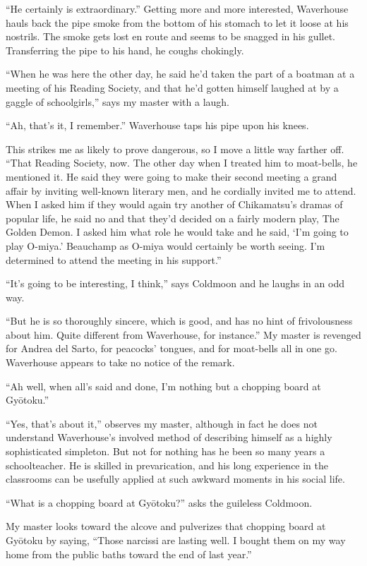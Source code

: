 \documentclass{book}
\begin{document}
``He certainly is extraordinary.'' Getting more and more interested,
Waverhouse hauls back the pipe smoke from the bottom of his stomach to
let it loose at his nostrils. The smoke gets lost en route and seems to
be snagged in his gullet. Transferring the pipe to his hand, he coughs
chokingly.

``When he was here the other day, he said he'd taken the part of a
boatman at a meeting of his Reading Society, and that he'd gotten
himself laughed at by a gaggle of schoolgirls,'' says my master with a
laugh.

``Ah, that's it, I remember.'' Waverhouse taps his pipe upon his knees.

This strikes me as likely to prove dangerous, so I move a little way
farther off. ``That Reading Society, now. The other day when I treated
him to moat-bells, he mentioned it. He said they were going to make
their second meeting a grand affair by inviting well-known literary men,
and he cordially invited me to attend. When I asked him if they would
again try another of Chikamatsu's dramas of popular life, he said no and
that they'd decided on a fairly modern play, The Golden Demon. I asked
him what role he would take and he said, `I'm going to play O-miya.'
Beauchamp as O-miya would certainly be worth seeing. I'm determined to
attend the meeting in his support.''

``It's going to be interesting, I think,'' says Coldmoon and he laughs
in an odd way.

``But he is so thoroughly sincere, which is good, and has no hint of
frivolousness about him. Quite different from Waverhouse, for
instance.'' My master is revenged for Andrea del Sarto, for peacocks'
tongues, and for moat-bells all in one go. Waverhouse appears to take no
notice of the remark.

``Ah well, when all's said and done, I'm nothing but a chopping board at
Gyōtoku.''

``Yes, that's about it,'' observes my master, although in fact he does
not understand Waverhouse's involved method of describing himself as a
highly sophisticated simpleton. But not for nothing has he been so many
years a schoolteacher. He is skilled in prevarication, and his long
experience in the classrooms can be usefully applied at such awkward
moments in his social life.

``What is a chopping board at Gyōtoku?'' asks the guileless Coldmoon.

My master looks toward the alcove and pulverizes that chopping board at
Gyōtoku by saying, ``Those narcissi are lasting well. I bought them on
my way home from the public baths toward the end of last year.''
\end{document}

